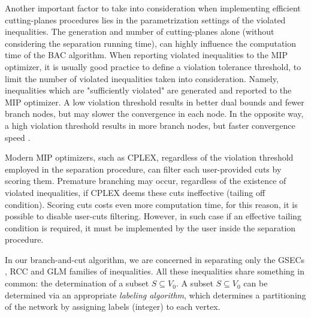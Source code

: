 Another important factor to take into consideration when implementing
efficient cutting-planes procedures lies in the parametrization settings
of the violated inequalities.
The generation and number of cutting-planes alone (without considering the separation running time),
can highly influence the computation time of the BAC algorithm.
When reporting violated inequalities to the MIP optimizer,
it is usually good practice to define a violation tolerance threshold,
to limit the number of violated inequalities taken into consideration.
Namely, inequalities which are "sufficiently violated" are generated and reported
to the MIP optimizer.
A low violation threshold results in better dual bounds and fewer branch nodes,
but may slower the convergence in each node.
In the opposite way, a high violation threshold results in more branch nodes,
but faster convergence speed \parencite{jepsen2008branchandcut}.

Modern MIP optimizers, such as CPLEX, regardless of the violation threshold
employed in the separation procedure,
can filter each user-provided cuts by scoring them.
Premature branching may occur, regardless of the existence of violated inequalities,
if CPLEX deems these cuts ineffective (tailing off condition).
Scoring cuts costs even more computation time,
for this reason,
it is possible to disable user-cuts filtering.
However, in such case if an effective tailing condition is required,
it must be implemented by the user inside the separation procedure.

\medskip

In our branch-and-cut algorithm,
we are concerned in separating only the
GSECs ,
RCC 
and GLM 
families of inequalities.
All these inequalities share something in common:
the determination of a subset $S \subseteq V_0$.
A subset $S \subseteq V_0$ can be determined via an appropriate \textit{labeling algorithm},
which determines a partitioning of the network by assigning labels (integer) to each vertex.

